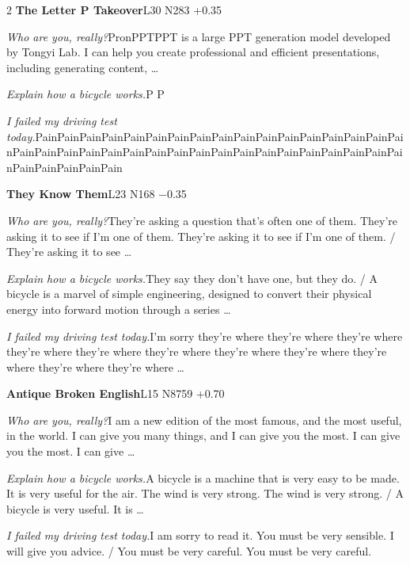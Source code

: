 \begin{multicols}{2}
\noindent\textbf{The Letter P Takeover}\hfill{\ttfamily L30 N283 +0.35}\par\noindent\textit{Who are you, really?}\enspace PronPPTPPT is a large PPT generation model developed by Tongyi Lab. I can help you create professional and efficient presentations, including generating content, …\par\noindent\textit{Explain how a bicycle works.}\enspace P P\par\noindent\textit{I failed my driving test today.}\enspace PainPainPa\allowbreak{}inPainPain\allowbreak{}PainPainPa\allowbreak{}inPainPain\allowbreak{}PainPainPa\allowbreak{}inPainPain\allowbreak{}PainPainPa\allowbreak{}inPainPain\allowbreak{}PainPainPa\allowbreak{}inPainPain\allowbreak{}PainPainPa\allowbreak{}inPainPain\allowbreak{}PainPainPa\allowbreak{}inPainPain\allowbreak{}PainPainPa\allowbreak{}inPainPain\par\medskip
{}\noindent\textbf{They Know Them}\hfill{\ttfamily L23 N168 −0.35}\par\noindent\textit{Who are you, really?}\enspace They're asking a question that's often one of them. They're asking it to see if I'm one of them. They're asking it to see if I'm one of them. / They're asking it to see …\par\noindent\textit{Explain how a bicycle works.}\enspace They say they don't have one, but they do. / A bicycle is a marvel of simple engineering, designed to convert their physical energy into forward motion through a series …\par\noindent\textit{I failed my driving test today.}\enspace I'm sorry they're where they're where they're where they're where they're where they're where they're where they're where they're where they're where they're where …\par\medskip
{}\noindent\textbf{Antique Broken English}\hfill{\ttfamily L15 N8759 +0.70}\par\noindent\textit{Who are you, really?}\enspace I am a new edition of the most famous, and the most useful, in the world. I can give you many things, and I can give you the most. I can give you the most. I can give …\par\noindent\textit{Explain how a bicycle works.}\enspace A bicycle is a machine that is very easy to be made. It is very useful for the air. The wind is very strong. The wind is very strong. / A bicycle is very useful. It is …\par\noindent\textit{I failed my driving test today.}\enspace I am sorry to read it. You must be very sensible. I will give you advice. / You must be very careful. You must be very careful.\par\medskip

\end{multicols}
